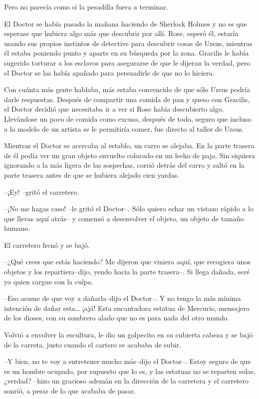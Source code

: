 Pero no parecía como si la pesadilla fuera a terminar.

El Doctor se había pasado la mañana haciendo de Sherlock Holmes y no es
que esperase que hubiera algo más que descubrir por allí. Rose, esperó
él, estaría usando sus propios instintos de detective para descubrir
cosas de Ursus, mientras él estaba poniendo punto y aparte en su
búsqueda por la zona. Gracilis le había sugerido torturar a los esclavos
para asegurarse de que le dijeran la verdad, pero el Doctor se las había
apañado para persuadirle de que no lo hiciera.

Con cuánta más gente hablaba, más estaba convencido de que sólo Ursus
podría darle respuestas. Después de compartir una comida de pan y queso
con Gracilis, el Doctor decidió que necesitaba ir a ver si Rose había
descubierto algo. Llevándose un poco de comida como excusa, después de
todo, seguro que incluso a la modelo de un artista se le permitiría
comer, fue directo al taller de Ursus.

Mientras el Doctor se acercaba al establo, un carro se alejaba. En la
parte trasera de él podía ver un gran objeto envuelto colocado en un
lecho de paja. Sin siquiera ignorando a la más ligera de las sospechas,
corrió detrás del carro y saltó en la parte trasera antes de que se
hubiera alejado cien yardas.

--¡Ey! --gritó el carretero.

--¡No me hagas caso! --le gritó el Doctor--. Sólo quiero echar un
vistazo rápido a lo que llevas aquí atrás-- y comenzó a desenvolver el
objeto, un objeto de tamaño humano.

El carretero frenó y se bajó.

--¿Qué crees que estás haciendo? Me dijeron que viniera aquí, que
recogiera unos objetos y los repartiera--dijo, yendo hacia la parte
trasera--. Si llega dañada, seré yo quien cargue con la culpa.

--Eso asume de que voy a dañarla--dijo el Doctor--. Y no tengo la más
mínima intención de dañar esta\ldots{} ¡ajá! Esta encantadora estatua de
Mercurio, mensajero de los dioses, con su sombrero alado que no es para
nada del otro mundo.

Volvió a envolver la escultura, le dio un golpecito en su cubierta
cabeza y se bajó de la carreta, justo cuando el cartero se acababa de
subir.

--Y bien, no te voy a entretener mucho más--dijo el Doctor--. Estoy
seguro de que es un hombre ocupado, por supuesto que lo es, y las
estatuas no se reparten solas, ¿verdad? --hizo un gracioso ademán en la
dirección de la carretera y el carretero sonrió, a pesar de lo que
acababa de pasar.

